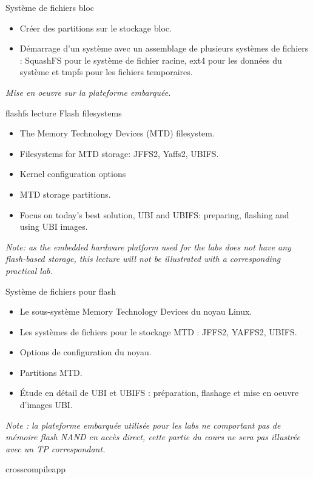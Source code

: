 {Système de fichiers bloc}
{
  \begin{itemize}
  \item Créer des partitions sur le stockage bloc.
  \item Démarrage d'un système avec un assemblage de plusieurs systèmes
    de fichiers : SquashFS pour le système de fichier racine, ext4 pour
    les données du système et tmpfs pour les fichiers temporaires.
  \end{itemize}
  \vspace{0.5cm}
  {\em Mise en oeuvre sur la plateforme embarquée.}
}
{flashfs}
{lecture}
{Flash filesystems}
{
  \begin{itemize}
  \item The Memory Technology Devices (MTD) filesystem.
  \item Filesystems for MTD storage: JFFS2, Yaffs2, UBIFS.
  \item Kernel configuration options
  \item MTD storage partitions.
  \item Focus on today's best solution, UBI and UBIFS:
	preparing, flashing and using UBI images.
  \end{itemize}

  \vspace{0.5cm}

  {\em Note: as the embedded hardware platform used for the labs does
    not have any flash-based storage, this lecture will not be
    illustrated with a corresponding practical lab.}
}
{Système de fichiers pour flash}
{
  \begin{itemize}
  \item Le sous-système Memory Technology Devices du noyau Linux.
  \item Les systèmes de fichiers pour le stockage MTD : JFFS2, YAFFS2,
    UBIFS.
  \item Options de configuration du noyau.
  \item Partitions MTD.
  \item Étude en détail de UBI et UBIFS : préparation, flashage et mise
    en oeuvre d'images UBI.
  \end{itemize}

  \vspace{0.5cm}

  {\em Note : la plateforme embarquée utilisée pour les labs ne
    comportant pas de mémoire flash NAND en accès direct, cette partie
    du cours ne sera pas illustrée avec un TP correspondant.}
}
{crosscompileapp}
